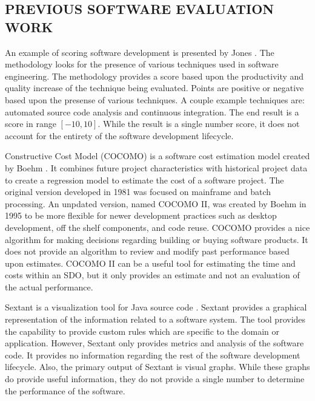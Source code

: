 \documentclass[SDSUThesis.tex]{subfiles}
\begin{document}
\subsection{PREVIOUS SOFTWARE EVALUATION WORK}

    An example of scoring software development is presented by 
    Jones \cite{Jones2012}. The methodology looks
    for the presence of various techniques used in software engineering.  
    The methodology provides a score based upon the 
    productivity and quality increase of the technique being evaluated.  
    Points are positive or negative based upon the 
    presense of various techniques. A couple example techniques are: 
    automated source code analysis and continuous integration.  The end 
    result is a score in range $[-10,10]$. 
    While the result is a single number score, it does not account for the 
    entirety of the software development lifecycle.

    Constructive Cost Model (COCOMO) is a software cost estimation model created
    by Boehm \cite{Boehm1981}.  It combines future project characteristics
    with historical project data to create a regression model to estimate the 
    cost of a software project.  The original version developed in 1981 was
    focused on mainframe and batch processing.  An unpdated version, named
    COCOMO II, was created by Boehm in 1995 to be more flexible for newer 
    development practices such as desktop development, off the shelf components,
    and code reuse.  COCOMO provides a nice algorithm for making decisions
    regarding building or buying software products.  It does not provide 
    an algorithm to review and modify past performance 
    based upon estimates.  COCOMO II can be a useful tool for 
    estimating the time and costs within an SDO,
    but it only provides an estimate and not an evaluation of the actual
    performance. 
    
    Sextant is a visualization tool for Java source code \cite{Winter2013}.  
    Sextant provides a graphical representation of the information related 
    to a software system.  The tool provides the capability to provide 
    custom rules which are specific to the domain or application.  However,
    Sextant only provides metrics and analysis of the software code.  
    It provides no information regarding the rest of the 
    software development lifecycle.  Also, the primary output of Sextant 
    is visual graphs.  While these graphs do provide
    useful information, they do not provide a single number 
    to determine the performance of the software.
\end{document}
